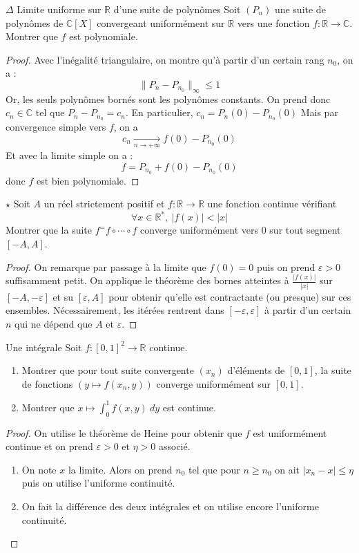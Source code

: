 \documentclass[french,a4paper]{article}
\newcommand{\R}{\mathbb{R}}
\newcommand{\C}{\mathbb{C}}
\newcommand{\st}{^*}
\theoremstyle{plain}
\theoremstyle{definition}
\theoremstyle{remark}
\begin{document}
\begin{ex}{$\Delta$ Limite uniforme sur $\R$ d'une suite de polynômes}
	Soit $(P_n)$ une suite de polynômes de $\C[X]$ convergeant uniformément sur $\R$ vers une fonction $f:\R\to\C$. Montrer que $f$ est polynomiale.
\end{ex}
\begin{proof}
	Avec l'inégalité triangulaire, on montre qu'à partir d'un certain rang $n_0$, on a : $$\lVert P_n-P_{n_0}\rVert_\infty\leqslant1$$ Or, les seuls polynômes bornés sont les polynômes constants. On prend donc $c_n\in\C$ tel que $P_n-P_{n_0}=c_n$. En particulier, $c_n=P_n(0)-P_{n_0}(0)$ Mais par convergence simple vers $f$, on a $$c_n\xrightarrow[n\to+\infty]{}f(0)-P_{n_0}(0)$$ Et avec la limite simple on a : $$f=P_{n_0}+f(0)-P_{n_0}(0)$$ donc $f$ est bien polynomiale.
\end{proof}

\begin{ex}{$\star$}
	Soit $A$ un réel strictement positif et $f:\R\to\R$ une fonction continue vérifiant $$\forall x\in\R\st,\ \lvert f(x)\rvert<\lvert x\rvert$$ Montrer que la suite $f^=f\circ \cdots\circ f$ converge uniformément vers $0$ sur tout segment $[-A,A]$.
\end{ex}
\begin{proof}
	On remarque par passage à la limite que $f(0)=0$ puis on prend $\varepsilon>0$ suffisamment petit. On applique le théorème des bornes atteintes à $\displaystyle\frac{\lvert f(x)\rvert}{\lvert x\rvert}$ sur $[-A,-\varepsilon]$ et su $[\varepsilon,A]$ pour obtenir qu'elle est contractante (ou presque) sur ces ensembles. Nécessairement, les itérées rentrent dans $[-\varepsilon,\varepsilon]$ à partir d'un certain $n$ qui ne dépend que $A$ et $\varepsilon$.
\end{proof}

\begin{ex}{Une intégrale}
	Soit $f:[0,1]^2\to\R$ continue.
	\begin{enumerate}
		\item Montrer que pour tout suite convergente $(x_n)$ d'éléments de $[0,1]$, la suite de fonctions $(y\mapsto f(x_n,y))$ converge uniformément sur $[0,1]$.
		\item Montrer que $x\mapsto\displaystyle\int_{0}^{1}f(x,y)\ dy$ est continue.
	\end{enumerate}
\end{ex}
\begin{proof}
	On utilise le théorème de Heine pour obtenir que $f$ est uniformément continue et on prend $\varepsilon>0$ et $\eta>0$ associé.
	\begin{enumerate}
		\item On note $x$ la limite. Alors on prend $n_0$ tel que pour $n\geqslant n_0$ on ait $\lvert x_n-x\rvert\leqslant\eta$ puis on utilise l'uniforme continuité.
		\item On fait la différence des deux intégrales et on utilise encore l'uniforme continuité.
	\end{enumerate}
\end{proof}
\end{document}
